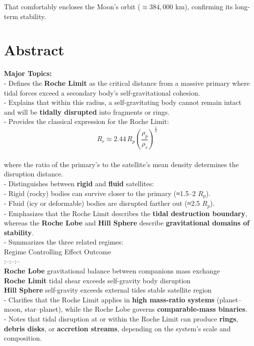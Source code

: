 \documentclass[
  letterpaper,
]{book}
\begin{document}
That comfortably encloses the Moon's orbit (\(≈ 384{,}000\) km),
confirming its long-term stability.

\chapter{Abstract}\label{abstract-47}

\textbf{Major Topics:}\\
- Defines the \textbf{Roche Limit} as the critical distance from a
massive primary where tidal forces exceed a secondary body's
self-gravitational cohesion.\\
- Explains that within this radius, a self-gravitating body cannot
remain intact and will be \textbf{tidally disrupted} into fragments or
rings.\\
- Provides the classical expression for the Roche Limit:\\
\[
  R_r \approx 2.44\,R_p
  \left(
    \frac{\rho_p}{\rho_s}
  \right)^{\!\tfrac{1}{3}}
  \]\\
where the ratio of the primary's to the satellite's mean density
determines the disruption distance.\\
- Distinguishes between \textbf{rigid} and \textbf{fluid} satellites:\\
- Rigid (rocky) bodies can survive closer to the primary (≈1.5--2
\(R_p\)).\\
- Fluid (icy or deformable) bodies are disrupted farther out (≈2.5
\(R_p\)).\\
- Emphasizes that the Roche Limit describes the \textbf{tidal
destruction boundary}, whereas the \textbf{Roche Lobe} and \textbf{Hill
Sphere} describe \textbf{gravitational domains of stability}.\\
- Summarizes the three related regimes:\\
\textbar{} Regime \textbar{} Controlling Effect \textbar{} Outcome
\textbar{}\\
\textbar:--\textbar:--\textbar:--\textbar{}\\
\textbar{} \textbf{Roche Lobe} \textbar{} gravitational balance between
companions \textbar{} mass exchange \textbar{}\\
\textbar{} \textbf{Roche Limit} \textbar{} tidal shear exceeds
self-gravity \textbar{} body disruption \textbar{}\\
\textbar{} \textbf{Hill Sphere} \textbar{} self-gravity exceeds external
tides \textbar{} stable satellite region \textbar{}\\
- Clarifies that the Roche Limit applies in \textbf{high mass-ratio
systems} (planet--moon, star--planet), while the Roche Lobe governs
\textbf{comparable-mass binaries}.\\
- Notes that tidal disruption at or within the Roche Limit can produce
\textbf{rings}, \textbf{debris disks}, or \textbf{accretion streams},
depending on the system's scale and composition.
\end{document}
